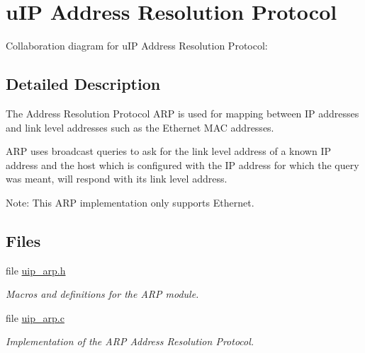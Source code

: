 \hypertarget{a00067}{
\section{u\-IP Address Resolution Protocol}
\label{a00067}
}


Collaboration diagram for u\-IP Address Resolution Protocol:

\subsection{Detailed Description}
The Address Resolution Protocol ARP is used for mapping between IP addresses and link level addresses such as the Ethernet MAC addresses. 

ARP uses broadcast queries to ask for the link level address of a known IP address and the host which is configured with the IP address for which the query was meant, will respond with its link level address.

\begin{Desc}
\item[Note:]This ARP implementation only supports Ethernet. \end{Desc}


\subsection*{Files}
\begin{CompactItemize}
\item 
file \hyperlink{a00057}{uip\_\-arp.h}
\begin{CompactList}\small\item\em Macros and definitions for the ARP module. \item\end{CompactList}

\item 
file \hyperlink{a00056}{uip\_\-arp.c}
\begin{CompactList}\small\item\em Implementation of the ARP Address Resolution Protocol. \item\end{CompactList}

\end{CompactItemize}
